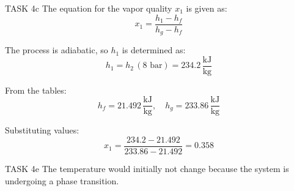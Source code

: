 TASK 4c  
The equation for the vapor quality \( x_1 \) is given as:  
\[
x_1 = \frac{h_1 - h_f}{h_g - h_f}
\]  

The process is adiabatic, so \( h_1 \) is determined as:  
\[
h_1 = h_2 \, (\text{8 bar}) = 234.2 \, \frac{\text{kJ}}{\text{kg}}
\]  

From the tables:  
\[
h_f = 21.492 \, \frac{\text{kJ}}{\text{kg}}, \quad h_g = 233.86 \, \frac{\text{kJ}}{\text{kg}}
\]  

Substituting values:  
\[
x_1 = \frac{234.2 - 21.492}{233.86 - 21.492} = 0.358
\]  

TASK 4e  
The temperature would initially not change because the system is undergoing a phase transition.
